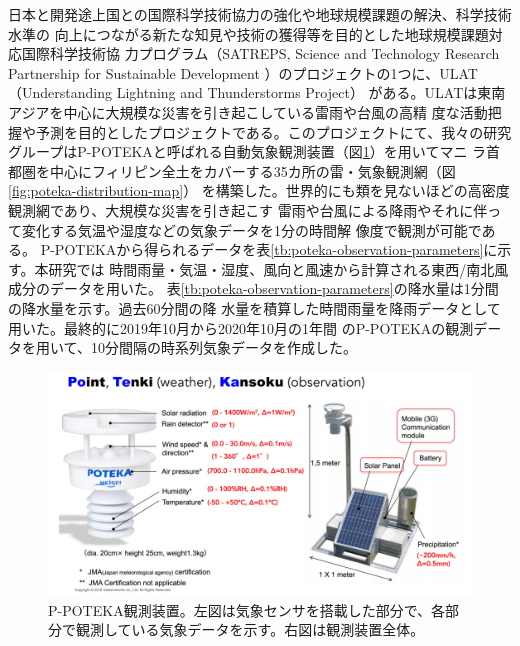 日本と開発途上国との国際科学技術協力の強化や地球規模課題の解決、科学技術水準の
向上につながる新たな知見や技術の獲得等を目的とした地球規模課題対応国際科学技術協
力プログラム（SATREPS, Science and Technology Research Partnership for Sustainable
Development ）のプロジェクトの1つに、ULAT（Understanding Lightning and Thunderstorms Project）
がある。ULATは東南アジアを中心に大規模な災害を引き起こしている雷雨や台風の高精
度な活動把握や予測を目的としたプロジェクトである。このプロジェクトにて、我々の研究
グループはP-POTEKAと呼ばれる自動気象観測装置（図\ref{fig:poteka-aws}）を用いてマニ
ラ首都圏を中心にフィリピン全土をカバーする35カ所の雷・気象観測網（図\ref{fig:poteka-distribution-map}）
を構築した。世界的にも類を見ないほどの高密度観測網であり、大規模な災害を引き起こす
雷雨や台風による降雨やそれに伴って変化する気温や湿度などの気象データを1分の時間解
像度で観測が可能である。
P-POTEKAから得られるデータを表\ref{tb:poteka-observation-parameters}に示す。本研究では
時間雨量・気温・湿度、風向と風速から計算される東西/南北風成分のデータを用いた。
表\ref{tb:poteka-observation-parameters}の降水量は1分間の降水量を示す。過去60分間の降
水量を積算した時間雨量を降雨データとして用いた。最終的に2019年10月から2020年10月の1年間
のP-POTEKAの観測データを用いて、10分間隔の時系列気象データを作成した。

\begin{figure}[H]
\begin{center}
\includegraphics[width=0.9\linewidth]{fig/methodologies/poteka-aws.png}
\captionsetup{width=0.9\linewidth}
\caption{P-POTEKA観測装置。左図は気象センサを搭載した部分で、各部分で観測している気象データを示す。右図は観測装置全体。}
\label{fig:poteka-aws}
\end{center}
\end{figure}

